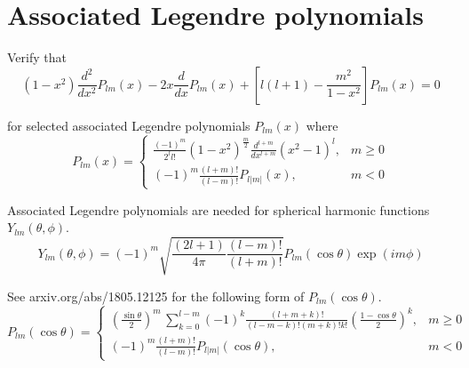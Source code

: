 

\section*{Associated Legendre polynomials}

Verify that
\begin{equation*}
(1-x^2)\frac{d^2}{dx^2}P_{lm}(x)-2x\frac{d}{dx}P_{lm}(x)+\left[l(l+1)-\frac{m^2}{1-x^2}\right]P_{lm}(x)=0
\tag{1}
\end{equation*}

for selected associated Legendre polynomials $P_{lm}(x)$ where
\begin{equation*}
P_{lm}(x)=\begin{cases}
\displaystyle
\frac{(-1)^m}{2^ll!}(1-x^2)^\frac{m}{2}\frac{d^{l+m}}{dx^{l+m}}(x^2-1)^l, & m\ge0
\\[3ex]
\displaystyle
(-1)^m\frac{(l+m)!}{(l-m)!}P_{l|m|}(x), & m<0
\end{cases}
\end{equation*}

Associated Legendre polynomials are needed for spherical harmonic functions $Y_{lm}(\theta,\phi)$.
\begin{equation*}
Y_{lm}(\theta,\phi)=(-1)^m\sqrt{\frac{(2l+1)}{4\pi}\frac{(l-m)!}{(l+m)!}}
P_{lm}(\cos\theta)\exp(im\phi)
\end{equation*}

See arxiv.org/abs/1805.12125 for the following form of $P_{lm}(\cos\theta)$.
\begin{equation*}
P_{lm}(\cos\theta)=\begin{cases}
\displaystyle
\left(\frac{\sin\theta}{2}\right)^m\,\sum_{k=0}^{l-m}
(-1)^k\frac{(l+m+k)!}{(l-m-k)!(m+k)!k!}
\left(\frac{1-\cos\theta}{2}\right)^k, & m\ge0
\\[4ex]
\displaystyle
(-1)^m\frac{(l+m)!}{(l-m)!}P_{l|m|}(\cos\theta), & m<0
\end{cases}
\end{equation*}


